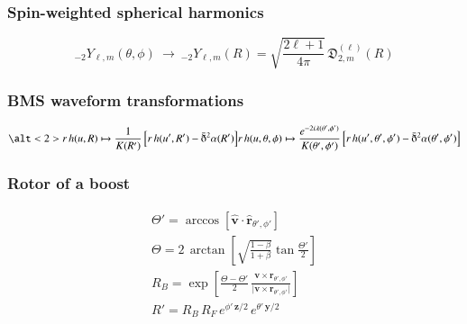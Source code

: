 \documentclass[12pt,xcolor={dvipsnames}]{beamer}
\renewcommand{\vec}{\bm}
\renewcommand{\vec}[1]{\boldsymbol{#1}}
\begin{document}


\begin{frame}
  \frametitle{Spin-weighted spherical harmonics}
  \begin{equation*}
    {}_{-2}Y_{\ell,m}(\theta, \phi)\ \longrightarrow\
    {}_{-2}Y_{\ell,m} (R)
    = \sqrt{\frac{2\ell+1} {4\pi}}\, \mathfrak{D}^{(\ell)}_{2,m}(R)
  \end{equation*}
\end{frame}

\begin{frame}
  \frametitle{BMS waveform transformations}
  \begin{equation*}
    \alt<2> %
    {r\, h(u, R) \mapsto \frac{1 \vphantom{e^{2}}} {K(R')} \left[ r\,
        h(u', R') - \bar{\eth}^{2} \alpha(R') \right]} %
    {r\, h(u, \theta, \phi) \mapsto \frac{e^{-2i \lambda(\theta', \phi')}}
      {K(\theta', \phi')} \left[ r\, h(u', \theta', \phi') -
        \bar{\eth}^{2} \alpha(\theta', \phi') \right]} %
  \end{equation*}
\end{frame}

\begin{frame}
  \frametitle{Rotor of a boost}
  \vspace{-0.3in}
  \begin{gather*}
    \Theta' = \arccos \left[ \hat{\vec{v}} \cdot
      \hat{\vec{r}}_{\theta', \phi'} \right]
    \\[15pt]
    \Theta = 2\, \arctan \left[ \sqrt{ \frac{1-\beta} {1+\beta} } \tan
      \frac{\Theta'}{2} \right]
    \\[15pt]
    R_{B} = \exp \left[ \frac{\Theta - \Theta'} {2}\, \frac{\vec{v}
        \times \vec{r}_{\theta', \phi'} } {\lvert \vec{v} \times
        \vec{r}_{\theta', \phi'} \rvert} \right]
    \\[20pt]
    R' = R_{B}\, R_{F}\, e^{\phi'\, \vec{z}/2}\, e^{\theta'\, \vec{y}/2}
  \end{gather*}
\end{frame}
\end{document}
